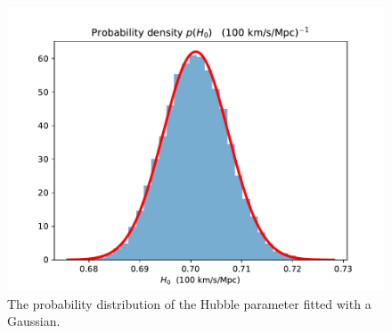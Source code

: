 \documentclass{aa}
\begin{document}
\begin{figure}[h!]
   \includegraphics[scale=0.6]{../figures/milestone1/prob_dist_H0.pdf}
   \caption{The probability distribution of the Hubble parameter fitted with a Gaussian.}\label{fig:M1_prob_dist}
\end{figure}
\end{document}
